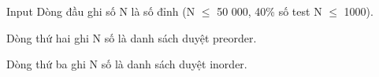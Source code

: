 Input \href{http://vi.wikipedia.org/wiki/Duy%E1%BB%87t_c%C3%A2y}{}
Dòng đầu ghi số N là số đỉnh (N  $\le$  50 000, 40\% số test N  $\le$  1000).

Dòng thứ hai ghi N số là danh sách duyệt preorder.

Dòng thứ ba ghi N số là danh sách duyệt inorder.